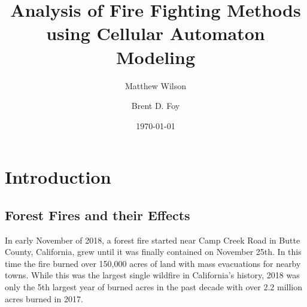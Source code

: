 \documentclass[ aps, pra, reprint, notitlepage ]{revtex4-1}
\begin{document}
\title{Analysis of Fire Fighting Methods using Cellular Automaton Modeling}



\author{Matthew Wilson}

\author{Brent D. Foy}

\date{\today}

\begin{abstract}
	
\end{abstract}

\maketitle


\section{\label{Intro}Introduction}

\subsection{\label{ForestFires} Forest Fires and their Effects}

In early November of 2018, a forest fire started near Camp Creek Road in Butte County, California, grew until it was finally contained on November 25th. In this time the fire burned over 150,000 acres of land with mass evacuations for nearby towns.\cite{CampFire, CampFireReport} While this was the largest single wildfire in California's history, 2018 was only the 5th largest year of burned acres in the past decade with over 2.2 million acres burned in 2017.\cite{WildFireYear}
\end{document}
